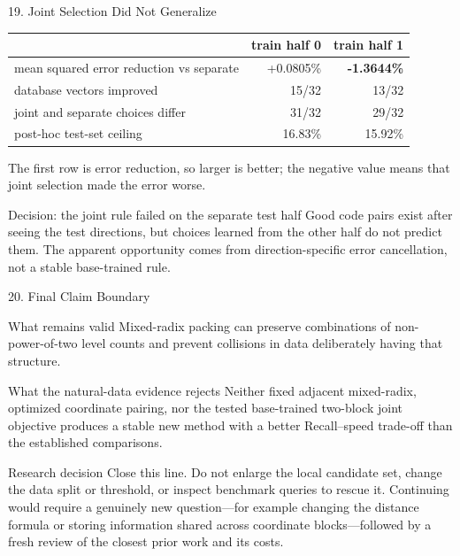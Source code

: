 \documentclass[aspectratio=169]{beamer}
\newcommand{\bad}[1]{\textcolor{red!75!black}{\textbf{#1}}}
\begin{document}
\begin{frame}{19. Joint Selection Did Not Generalize}
\small
\begin{center}
\begin{tabular}{lrr}
\toprule
& train half 0 & train half 1\\
\midrule
mean squared error reduction vs separate & +0.0805\% & \bad{-1.3644\%}\\
database vectors improved & 15/32 & 13/32\\
joint and separate choices differ & 31/32 & 29/32\\
post-hoc test-set ceiling & 16.83\% & 15.92\%\\
\bottomrule
\end{tabular}
\end{center}
The first row is error reduction, so larger is better; the negative value
means that joint selection made the error worse.
\begin{alertblock}{Decision: the joint rule failed on the separate test half}
Good code pairs exist after seeing the test directions, but choices learned
from the other half do not predict them. The apparent opportunity comes from
direction-specific error cancellation, not a stable base-trained rule.
\end{alertblock}
\end{frame}

\begin{frame}{20. Final Claim Boundary}
\begin{block}{What remains valid}
Mixed-radix packing can preserve combinations of non-power-of-two level counts
and prevent collisions in data deliberately having that structure.
\end{block}
\begin{alertblock}{What the natural-data evidence rejects}
Neither fixed adjacent mixed-radix, optimized coordinate pairing, nor the
tested base-trained two-block joint objective produces a stable new method
with a better Recall--speed trade-off than the established comparisons.
\end{alertblock}
\begin{block}{Research decision}
Close this line. Do not enlarge the local candidate set, change the data split
or threshold, or inspect benchmark queries to rescue it. Continuing would
require a genuinely new question---for example changing the distance formula
or storing information shared across coordinate blocks---followed by a fresh
review of the closest prior work and its costs.
\end{block}
\end{frame}
\end{document}
